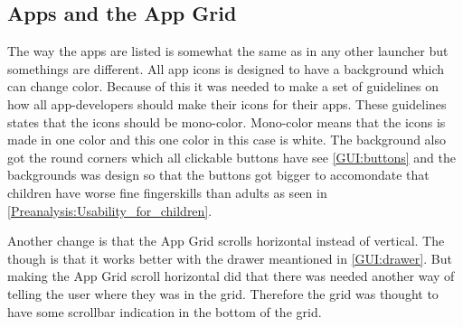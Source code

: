 \subsection{Apps and the App Grid}
\label{GUI:app}

The way the apps are listed is somewhat the same as in any other launcher but somethings are different. All app icons is designed to have a background which can change color. Because of this it was needed to make a set of guidelines on how all app-developers should make their icons for their apps. These guidelines states that the icons should be mono-color. Mono-color means that the icons is made in one color and this one color in this case is white.
The background also got the round corners which all clickable buttons have see \autoref{GUI:buttons} and the backgrounds was design so that the buttons got bigger to accomondate that children have worse fine fingerskills than adults as seen in \autoref{Preanalysis:Usability_for_children}.

Another change is that the App Grid scrolls horizontal instead of vertical. The though is that it works better with the drawer meantioned in \autoref{GUI:drawer}. But making the App Grid scroll horizontal did that there was needed another way of telling the user where they was in the grid. Therefore the grid was thought to have some scrollbar indication in the bottom of the grid.